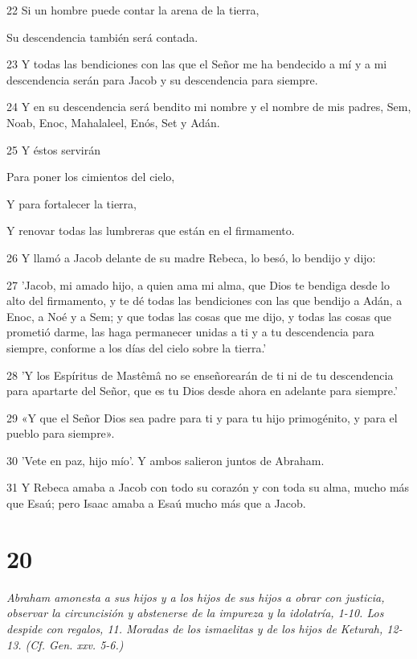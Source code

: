 \par    
\par 22 Si un hombre puede contar la arena de la tierra,  
\par     Su descendencia también será contada.
\par    
\par 23 Y todas las bendiciones con las que el Señor me ha bendecido a mí y a mi descendencia serán para Jacob y su descendencia para siempre.
\par 24 Y en su descendencia será bendito mi nombre y el nombre de mis padres, Sem, Noab, Enoc, Mahalaleel, Enós, Set y Adán.
\par 25 Y éstos servirán
\par    
\par     Para poner los cimientos del cielo,  
\par     Y para fortalecer la tierra,  
\par     Y renovar todas las lumbreras que están en el firmamento.
\par    
\par 26 Y llamó a Jacob delante de su madre Rebeca, lo besó, lo bendijo y dijo:
\par 27 'Jacob, mi amado hijo, a quien ama mi alma, que Dios te bendiga desde lo alto del firmamento, y te dé todas las bendiciones con las que bendijo a Adán, a Enoc, a Noé y a Sem; y que todas las cosas que me dijo, y todas las cosas que prometió darme, las haga permanecer unidas a ti y a tu descendencia para siempre, conforme a los días del cielo sobre la tierra.'
\par 28 'Y los Espíritus de Mastêmâ no se enseñorearán de ti ni de tu descendencia para apartarte del Señor, que es tu Dios desde ahora en adelante para siempre.'
\par 29 «Y que el Señor Dios sea padre para ti y para tu hijo primogénito, y para el pueblo para siempre».
\par 30 'Vete en paz, hijo mío'. Y ambos salieron juntos de Abraham.
\par 31 Y Rebeca amaba a Jacob con todo su corazón y con toda su alma, mucho más que Esaú; pero Isaac amaba a Esaú mucho más que a Jacob.

\chapter{20}

\par \textit{Abraham amonesta a sus hijos y a los hijos de sus hijos a obrar con justicia, observar la circuncisión y abstenerse de la impureza y la idolatría, 1-10. Los despide con regalos, 11. Moradas de los ismaelitas y de los hijos de Keturah, 12-13. (Cf. Gen. xxv. 5-6.)}

